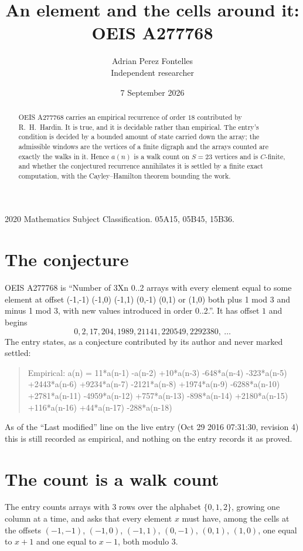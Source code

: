 \documentclass[11pt,a4paper]{article}
\title{An element and the cells around it: OEIS A277768}
\author{Adrian Perez Fontelles\\ \small Independent researcher}
\date{7 September 2026}
\theoremstyle{plain}
\theoremstyle{definition}
\begin{document}
\maketitle

\begin{abstract}
OEIS A277768 carries an empirical recurrence of order $18$ contributed by R.~H.~Hardin. It is
true, and it is decidable rather than empirical. The entry's condition is decided by a bounded amount of state carried down the array; the
admissible windows are the vertices of a finite digraph and the arrays counted are exactly the
walks in it. Hence $a(n)$ is a walk count on $S=23$ vertices and is $C$-finite, and whether the
conjectured recurrence annihilates it is settled by a finite exact computation, with the
Cayley--Hamilton theorem bounding the work.
\end{abstract}

\noindent\small 2020 Mathematics Subject Classification. 05A15, 05B45, 15B36.\normalsize

\section{The conjecture}

OEIS A277768 is ``Number of 3Xn 0..2 arrays with every element equal to some element at offset (-1,-1) (-1,0) (-1,1) (0,-1) (0,1) or (1,0) both plus 1 mod 3 and minus 1 mod 3, with new values introduced in order 0..2.''. It has offset $1$ and begins
\[
0, 2, 17, 204, 1989, 21141, 220549, 2292380,\ \dots
\]
The entry states, as a conjecture contributed by its author and never marked settled:
\begin{quote}
Empirical: a(n) = 11*a(n-1) -a(n-2) +10*a(n-3) -648*a(n-4) -323*a(n-5) +2443*a(n-6) +9234*a(n-7) -2121*a(n-8) +1974*a(n-9) -6288*a(n-10) +2781*a(n-11) -4959*a(n-12) +757*a(n-13) -898*a(n-14) +2180*a(n-15) +116*a(n-16) +44*a(n-17) -288*a(n-18)
\end{quote}
As of the ``Last modified'' line on the live entry (Oct 29 2016 07:31:30, revision 4) this is still
recorded as empirical, and nothing on the entry records it as proved.

\section{The count is a walk count}

The entry counts arrays with $3$ rows over the alphabet $\{0,1,2\}$, growing one column at a time, and asks that every element $x$ must have, among the cells at the offsets $(-1,-1)$, $(-1,0)$, $(-1,1)$, $(0,-1)$, $(0,1)$, $(1,0)$, one equal to $x+1$ and one equal to $x-1$, both modulo $3$.
\end{document}
